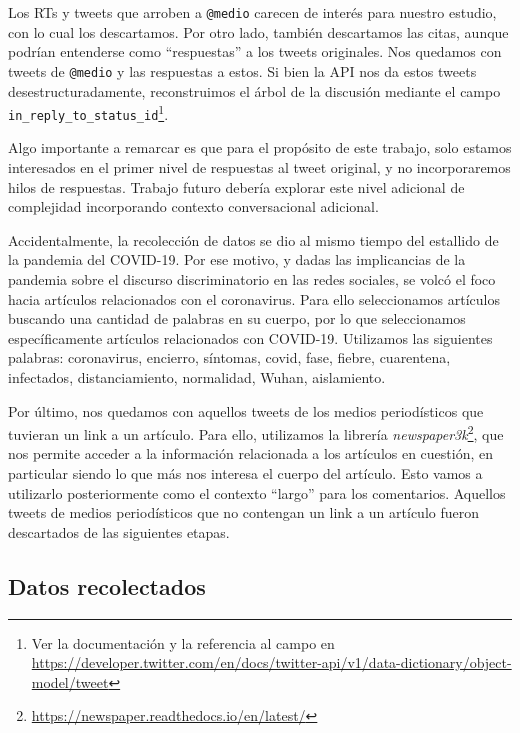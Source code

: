 Los RTs y tweets que arroben a \verb|@medio| carecen de interés para nuestro estudio, con lo cual los descartamos. Por otro lado, también descartamos las citas, aunque podrían entenderse como ``respuestas'' a los tweets originales. Nos quedamos con tweets de \verb|@medio| y las respuestas a estos. Si bien la API nos da estos tweets desestructuradamente, reconstruimos el árbol de la discusión mediante el campo \verb|in_reply_to_status_id|\footnote{Ver la documentación y la referencia al campo en \url{https://developer.twitter.com/en/docs/twitter-api/v1/data-dictionary/object-model/tweet}}.

Algo importante a remarcar es que para el propósito de este trabajo, solo estamos interesados en el primer nivel de respuestas al tweet original, y no incorporaremos hilos de respuestas. Trabajo futuro debería explorar este nivel adicional de complejidad incorporando contexto conversacional adicional.

Accidentalmente, la recolección de datos se dio al mismo tiempo del estallido de la pandemia del COVID-19. Por ese motivo, y dadas las implicancias de la pandemia sobre el discurso discriminatorio en las redes sociales, se volcó el foco hacia artículos relacionados con el coronavirus. Para ello seleccionamos artículos buscando una cantidad de palabras en su cuerpo, por lo que seleccionamos específicamente artículos relacionados con COVID-19. Utilizamos las siguientes palabras: coronavirus, encierro, síntomas, covid, fase, fiebre, cuarentena, infectados, distanciamiento, normalidad,  Wuhan, aislamiento.

Por último, nos quedamos con aquellos tweets de los medios periodísticos que tuvieran un link a un artículo. Para ello, utilizamos la librería \emph{newspaper3k}\footnote{\url{https://newspaper.readthedocs.io/en/latest/}}, que nos permite acceder a la información relacionada a los artículos en cuestión, en particular siendo lo que más nos interesa el cuerpo del artículo. Esto vamos a utilizarlo posteriormente como el contexto ``largo'' para los comentarios. Aquellos tweets de medios periodísticos que no contengan un link a un artículo fueron descartados de las siguientes etapas.

\subsection{Datos recolectados}

